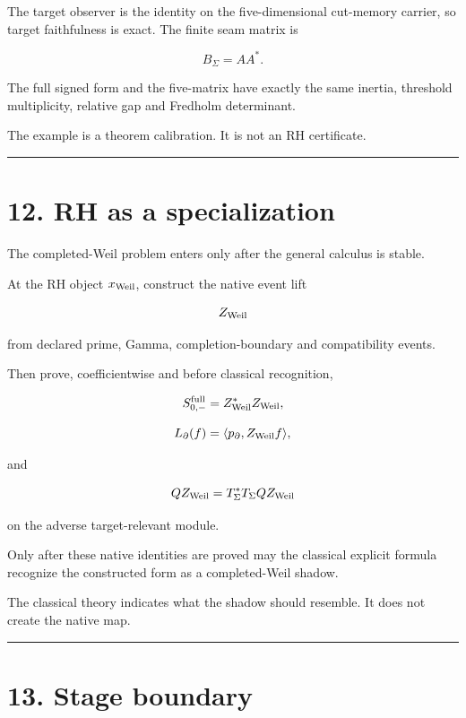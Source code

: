 The target observer is the identity on the five-dimensional cut-memory carrier,
so target faithfulness is exact. The finite seam matrix is

\[
B_\Sigma=AA^*.
\]

The full signed form and the five-matrix have exactly the same inertia,
threshold multiplicity, relative gap and Fredholm determinant.

The example is a theorem calibration. It is not an RH certificate.

\begin{center}\rule{0.5\linewidth}{0.5pt}\end{center}

\hypertarget{rh-as-a-specialization}{%
\section{12. RH as a specialization}\label{rh-as-a-specialization}}

The completed-Weil problem enters only after the general calculus is stable.

At the RH object \(x_{\rm Weil}\), construct the native event lift

\[
Z_{\rm Weil}
\]

from declared prime, Gamma, completion-boundary and compatibility events.

Then prove, coefficientwise and before classical recognition,

\[
S_{0,-}^{\rm full}=Z_{\rm Weil}^*Z_{\rm Weil},
\]

\[
L_\partial(f)=\langle p_\partial,Z_{\rm Weil}f\rangle,
\]

and

\[
QZ_{\rm Weil}
=T_\Sigma^*T_\Sigma QZ_{\rm Weil}
\]

on the adverse target-relevant module.

Only after these native identities are proved may the classical explicit formula
recognize the constructed form as a completed-Weil shadow.

The classical theory indicates what the shadow should resemble. It does not
create the native map.

\begin{center}\rule{0.5\linewidth}{0.5pt}\end{center}

\hypertarget{stage-boundary}{%
\section{13. Stage boundary}\label{stage-boundary}}

